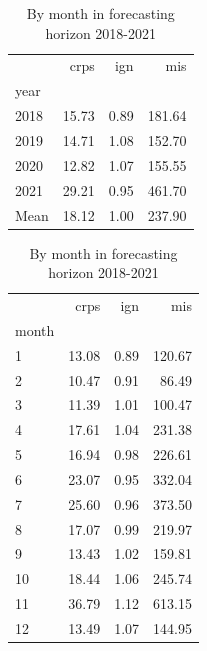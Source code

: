 \documentclass[runningheads]{llncs}
\begin{document}
    \begin{table}[!htb]

        \begin{subtable}{.3\linewidth}
            \centering

            \begin{tabular}{lrrr}
                \toprule
                & crps  & ign  & mis    \\
                year &       &      &        \\
                \midrule
                2018 & 15.73 & 0.89 & 181.64 \\
                2019 & 14.71 & 1.08 & 152.70 \\
                2020 & 12.82 & 1.07 & 155.55 \\
                2021 & 29.21 & 0.95 & 461.70 \\
                Mean & 18.12 & 1.00 & 237.90 \\
                \bottomrule
            \end{tabular}
            \caption{By calendar year}
            \label{tab:ngboost_a}
        \end{subtable}%
        \begin{subtable}{.3\linewidth}
            \centering

            \begin{tabular}{lrrr}
                \toprule
                & crps  & ign  & mis    \\
                month &       &      &        \\
                \midrule
                1     & 13.08 & 0.89 & 120.67 \\
                2     & 10.47 & 0.91 & 86.49  \\
                3     & 11.39 & 1.01 & 100.47 \\
                4     & 17.61 & 1.04 & 231.38 \\
                5     & 16.94 & 0.98 & 226.61 \\
                6     & 23.07 & 0.95 & 332.04 \\
                7     & 25.60 & 0.96 & 373.50 \\
                8     & 17.07 & 0.99 & 219.97 \\
                9     & 13.43 & 1.02 & 159.81 \\
                10    & 18.44 & 1.06 & 245.74 \\
                11    & 36.79 & 1.12 & 613.15 \\
                12    & 13.49 & 1.07 & 144.95 \\
                \bottomrule
            \end{tabular}
            \caption{By month in forecasting horizon 2018-2021}
            \label{tab:ngboost_b}
        \end{subtable}


\end{table}
\end{document}
